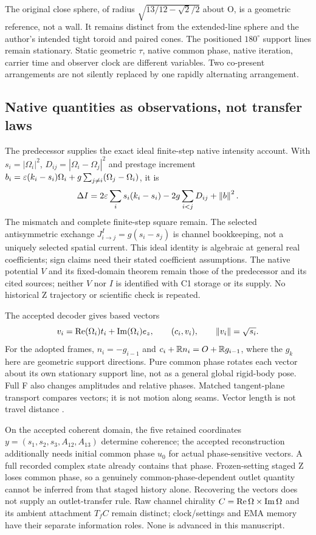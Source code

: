 The original close sphere, of radius $\sqrt{13/12-\sqrt2/2}$ about O, is a geometric reference, not a wall. It remains distinct from the extended-line sphere and the author's intended tight toroid and paired cones. The positioned $180^\circ$ support lines remain stationary. Static geometric $\tau$, native common phase, native iteration, carrier time and observer clock are different variables. Two co-present arrangements are not silently replaced by one rapidly alternating arrangement.

\subsection{Native quantities as observations, not transfer laws}\label{sec:native}
The predecessor \cite{intensity} supplies the exact ideal finite-step native intensity account. With $s_i=|\Omega_i|^2$, $D_{ij}=|\Omega_i-\Omega_j|^2$ and prestage increment
$b_i=\varepsilon(k_i-s_i)\Omega_i+g\sum_{j\ne i}(\Omega_j-\Omega_i)$, it is
\begin{equation}\label{eq:native}
 \Delta I=2\varepsilon\sum_i s_i(k_i-s_i)-2g\sum_{i<j}D_{ij}+\left\|b\right\|^2.
\end{equation}
The mismatch and complete finite-step square remain. The selected antisymmetric exchange $J^I_{i\to j}=g(s_i-s_j)$ is channel bookkeeping, not a uniquely selected spatial current. This ideal identity is algebraic at general real coefficients; sign claims need their stated coefficient assumptions. The native potential $V$ and its fixed-domain theorem remain those of the predecessor and its cited sources; neither $V$ nor $I$ is identified with C1 storage or its supply. No historical Z trajectory or scientific check is repeated.

The accepted decoder gives based vectors
\begin{equation}\label{eq:decoder}
 v_i=\operatorname{Re}(\Omega_i)t_i+\operatorname{Im}(\Omega_i)e_z,\qquad (c_i,v_i),\qquad
 \left\|v_i\right\|=\sqrt{s_i}.
\end{equation}
For the adopted frames, $n_i=-g_{i-1}$ and
$c_i+\mathbb R n_i=O+\mathbb R g_{i-1}$, where the $g_k$ here are geometric support directions. Pure common phase rotates each vector about its own stationary support line, not as a general global rigid-body pose. Full F also changes amplitudes and relative phases. Matched tangent-plane transport compares vectors; it is not motion along seams. Vector length is not travel distance \cite{phase,intensity}.

On the accepted coherent domain, the five retained coordinates
$y=(s_1,s_2,s_3,A_{12},A_{13})$ determine coherence; the accepted reconstruction additionally needs initial common phase $u_0$ for actual phase-sensitive vectors. A full recorded complex state already contains that phase. Frozen-setting staged Z loses common phase, so a genuinely common-phase-dependent outlet quantity cannot be inferred from that staged history alone. Recovering the vectors does not supply an outlet-transfer rule. Raw channel chirality $C=\operatorname{Re}\Omega\times\operatorname{Im}\Omega$ and its ambient attachment $T_fC$ remain distinct; clock/settings and EMA memory have their separate information roles. None is advanced in this manuscript.

